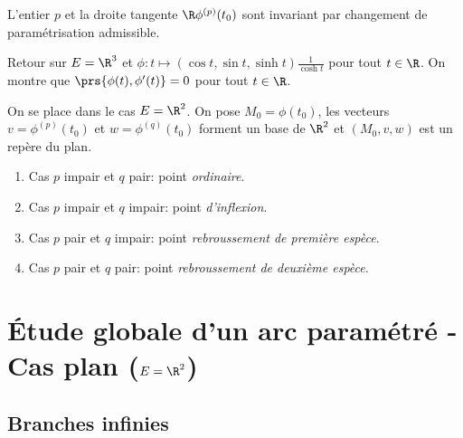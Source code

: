 \begin{remark}
	L'entier $p$ et la droite tangente $\R\phi^{(p)}(t_0)$ sont invariant par changement de paramétrisation admissible.
\end{remark}

\begin{exemple}
	Retour sur $E =\R^3$ et $\phi: t \mapsto \left( \cos t, \sin t , \sinh t \right) \frac{1}{\cosh t} $ pour tout $t\in\R$. On montre que $\prs{\phi(t),\phi'(t)} = 0$ pour tout $t\in\R$.
	\pl{\rep{5cm}}
\end{exemple}
\sld{\vfill\pagebreak[5]}%
\begin{defprop}
	On se place dans le cas $E=\R^2$. On pose $M_0=\phi(t_0)$, les vecteurs $v = \phi^{(p)}(t_0) $ et $w = \phi^{(q)}(t_0)$  forment un base de $\R^2$ et $(M_0,v,w)$ est un repère du plan.
\begin{enumerate}
\item Cas $p$ impair et $q$ pair: point \emph{ordinaire}.
	\begin{center}
		
	\end{center}
\item Cas $p$ impair et $q$ impair: point \emph{d'inflexion}.
	\begin{center}
		
	\end{center}\sld{\vfill\pagebreak[5]}%
\item Cas $p$ pair et $q$ impair: point \emph{rebroussement de première espèce}.
	\begin{center}
		
	\end{center}
\item Cas $p$ pair et $q$ pair: point \emph{rebroussement de deuxième espèce}.
	\begin{center}
		
	\end{center}
\end{enumerate}
\end{defprop}

\pl{\rep{6cm}}
\sld{\vfill\pagebreak[5]}%

\section{\'Etude globale d'un arc paramétré - Cas plan ($E=\R^2$)}


\subsection{Branches infinies}

